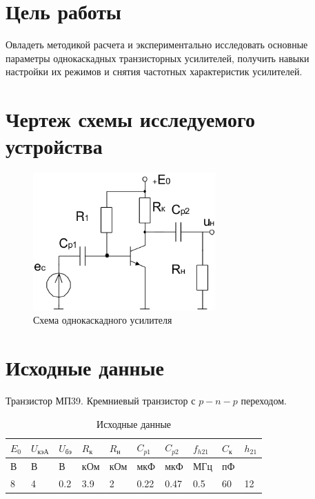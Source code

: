 





\section{Цель работы}

Овладеть методикой расчета и экспериментально исследовать основные параметры однокаскадных транзисторных усилителей, получить навыки настройки их режимов и снятия частотных характеристик усилителей.

\section{Чертеж схемы исследуемого устройства}

\begin{figure}[H]
	\begin{center}
	\vspace{-0.5cm}
		\includegraphics[width=7cm]{img/scheme}
		\caption{Схема однокаскадного усилителя}
		\label{figure:1}
	\vspace{-0.5cm}
	\end{center}
\end{figure}

\section{Исходные данные}

Транзистор МП39. Кремниевый транзистор с $p-n-p$ переходом.

\begin{table}[H]
	\begin{center}
	\caption{Исходные данные}
	\def\arraystretch{1.4}
		\begin{tabularx}{\textwidth}{|X|X|X|X|X|X|X|X|X|X|}
			\hline
			$E_0$ &
			$U_\text{кэА}$ &
			$U_\text{бэ}$ &
			$R_\text{к}$ &
			$R_\text{н}$ &
			$C_{p1}$ &
			$C_{p2}$ &
			$f_{h21}$ &
			$C_\text{к}$ &
			$h_{21}$ \\
			\hline
			В &
			В &
			В &
			кОм &
			кОм &
			мкФ &
			мкФ &
			МГц &
			пФ &
			\\
			\hline
			8 &
			4 &
			0.2 &
			3.9 &
			2 &
			0.22 &
			0.47 &
			0.5 &
			60 &
			12 \\
		    \hline	
		\end{tabularx}
		\label{tabular:1}
	\end{center}
\end{table}

